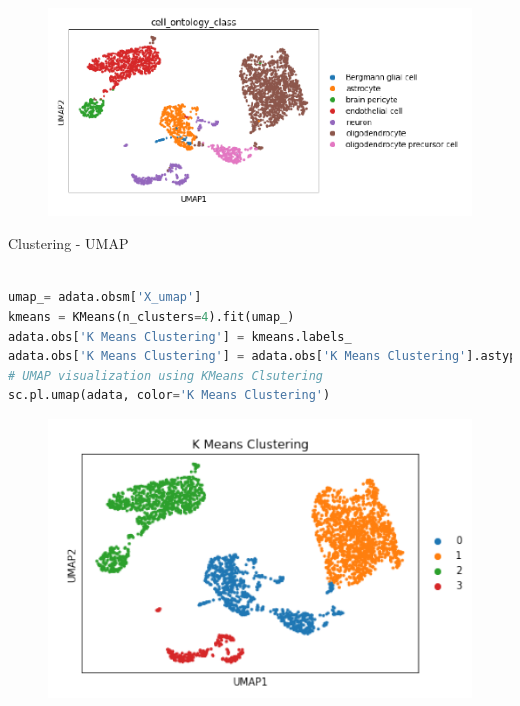 \documentclass{article}
\begin{document}
\begin{figure}
    \centering
    \includegraphics{12.png}
\end{figure}
Clustering - UMAP
\begin{lstlisting}[language=Python]

umap_= adata.obsm['X_umap']
kmeans = KMeans(n_clusters=4).fit(umap_)
adata.obs['K Means Clustering'] = kmeans.labels_
adata.obs['K Means Clustering'] = adata.obs['K Means Clustering'].astype(str)
# UMAP visualization using KMeans Clsutering
sc.pl.umap(adata, color='K Means Clustering')
\end{lstlisting}
        
\begin{figure}
    \centering
    \includegraphics{13.png}
\end{figure}        

\newpage
\end{document}
